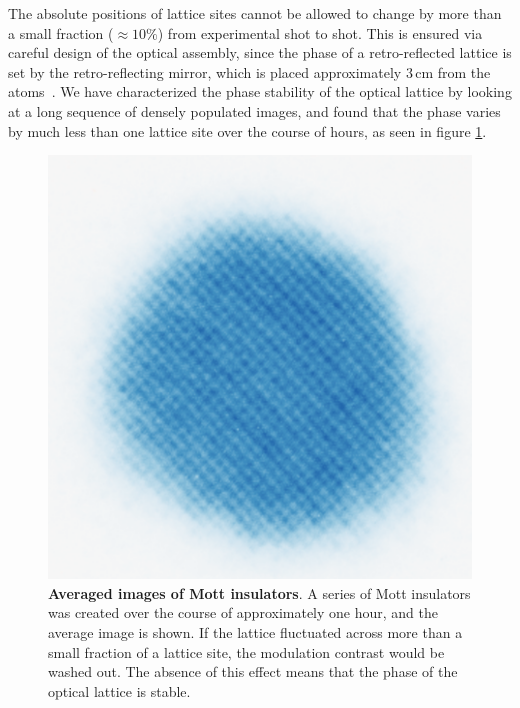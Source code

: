 \documentclass[twocolumn,aps,pra,showpacs,preprintnumbers,bibnotes]{revtex4-1}
\begin{document}
The absolute positions of lattice sites cannot be allowed to change by more than a small fraction ($\approx 10\%$) from experimental shot to shot.
This is ensured via careful design of the optical assembly, since the phase of a retro-reflected lattice is set by the retro-reflecting mirror, which is placed approximately $3\,$cm from the atoms~\cite{Huber2014}. 
We have characterized the phase stability of the optical lattice by looking at a long sequence of densely populated images, and found that the phase varies by much less than one lattice site over the course of hours, as seen in figure \ref{fig:averaged_mott}.

\begin{figure}
  \begin{center}
    \includegraphics[width=\columnwidth]{fig/averaged_mott.png}
    \caption{\textbf{Averaged images of Mott insulators}. A series of Mott insulators was created over the course of approximately one hour, and the average image is shown\cite{Greif2016}. If the lattice fluctuated across more than a small fraction of a lattice site, the modulation contrast would be washed out. The absence of this effect means that the phase of the optical lattice is stable.}\label{fig:averaged_mott}
  \end{center}
\end{figure}
\end{document}
